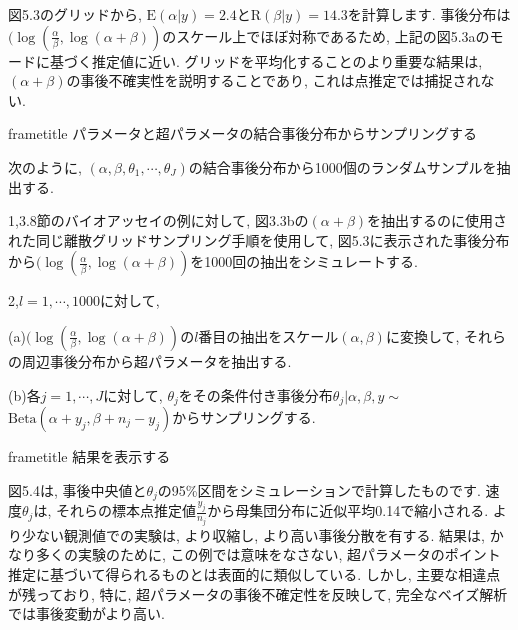 \documentclass[10pt,dvipdfmx,a4]{beamer}
\newcommand{\dbox}[1]{\begin{beamercolorbox}[wd=122mm, sep=0pt, shadow=false, rounded=false]{frametitle} { #1}\end{beamercolorbox}}
\begin{document}

\begin{frame}
図5.3のグリッドから, $\text{E}(\alpha|y)=2.4$と$\text{R}(\beta|y)=14.3$を計算します.
事後分布は$(\log(\tfrac{\alpha}{\beta},\log(\alpha+\beta))$のスケール上でほぼ対称であるため, 上記の図5.3aのモードに基づく推定値に近い.
グリッドを平均化することのより重要な結果は, $(\alpha+\beta)$の事後不確実性を説明することであり, これは点推定では捕捉されない.

\dbox{パラメータと超パラメータの結合事後分布からサンプリングする}
次のように, $(\alpha,\beta,\theta_1,\cdots,\theta_J)$の結合事後分布から1000個のランダムサンプルを抽出する.

1,3.8節のバイオアッセイの例に対して, 図3.3bの$(\alpha+\beta)$を抽出するのに使用された同じ離散グリッドサンプリング手順を使用して, 図5.3に表示された事後分布から$(\log(\tfrac{\alpha}{\beta}, \log(\alpha+\beta))$を1000回の抽出をシミュレートする.

2,$l=1,\cdots,1000$に対して,

(a)$(\log(\tfrac{\alpha}{\beta}, \log(\alpha+\beta))$の$l$番目の抽出をスケール$(\alpha, \beta)$に変換して, それらの周辺事後分布から超パラメータを抽出する.

(b)各$j=1,\cdots,J$に対して, $\theta_j$をその条件付き事後分布$\theta_j|\alpha,\beta,y\sim$ $\text{Beta}(\alpha+y_j,\beta+n_j-y_j)$からサンプリングする.
\end{frame}


\begin{frame}
\dbox{結果を表示する}
図5.4は, 事後中央値と$\theta_j$の95\%区間をシミュレーションで計算したものです.
速度$\theta_j$は, それらの標本点推定値$\tfrac{y_j}{n_j}$から母集団分布に近似平均0.14で縮小される.
より少ない観測値での実験は, より収縮し, より高い事後分散を有する.
結果は, かなり多くの実験のために, この例では意味をなさない, 超パラメータのポイント推定に基づいて得られるものとは表面的に類似している.
しかし, 主要な相違点が残っており, 特に, 超パラメータの事後不確定性を反映して, 完全なベイズ解析では事後変動がより高い.
\end{frame}

\end{document}
